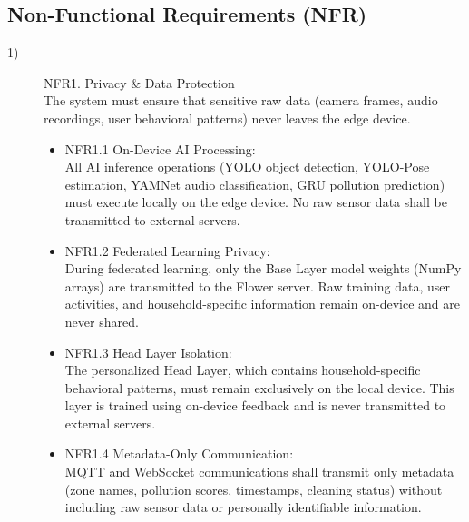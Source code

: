 \documentclass[conference]{IEEEtran}
\begin{document}
\subsection{Non-Functional Requirements (NFR)}
\begin{description}
    \item[1)] NFR1. Privacy \& Data Protection \\
    The system must ensure that sensitive raw data (camera frames, audio recordings, user behavioral patterns) never leaves the edge device.
    \begin{itemize}
        \item NFR1.1 On-Device AI Processing: \\
        All AI inference operations (YOLO object detection, YOLO-Pose estimation, YAMNet audio classification, GRU pollution prediction) must execute locally on the edge device. No raw sensor data shall be transmitted to external servers.
        \item NFR1.2 Federated Learning Privacy: \\
        During federated learning, only the Base Layer model weights (NumPy arrays) are transmitted to the Flower server. Raw training data, user activities, and household-specific information remain on-device and are never shared.
        \item NFR1.3 Head Layer Isolation: \\
        The personalized Head Layer, which contains household-specific behavioral patterns, must remain exclusively on the local device. This layer is trained using on-device feedback and is never transmitted to external servers.
        \item NFR1.4 Metadata-Only Communication: \\
        MQTT and WebSocket communications shall transmit only metadata (zone names, pollution scores, timestamps, cleaning status) without including raw sensor data or personally identifiable information.
    \end{itemize}

    \vspace{1em}


\end{description}
\end{document}
